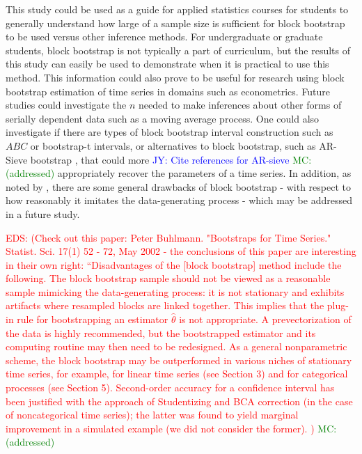 \documentclass[12pt, letterpaper, titlepage]{article}
\newcommand{\jy}[1]{\textcolor{blue}{JY: #1}}
\newcommand{\eds}[1]{\textcolor{red}{EDS: (#1)}}
\newcommand{\mc}[1]{\textcolor{green}{MC: (#1)}}
\begin{document}
This study could be used as a guide for applied statistics courses for students
to generally understand how large of a sample size is sufficient for block
bootstrap to be used versus other inference methods. For undergraduate or
graduate students, block bootstrap is not typically a part of curriculum, but
the results of this study can easily be used to demonstrate when it is
practical to use this method. This information could also prove to be useful
for research using block bootstrap estimation of time series in domains such
as econometrics. Future studies could investigate the $n$ needed to make
inferences about other forms
of serially dependent data such as a moving average process. One could also
investigate if there are types of block
bootstrap interval construction such as $ABC$ or bootstrap-t intervals, or
alternatives to block bootstrap, such as AR-Sieve bootstrap
 \citep{kreiss1992bootstrap}, that could more
\jy{Cite references for AR-sieve} \mc{addressed}
appropriately recover the parameters of a time series. In addition, as noted by
\citet{buhlmann2002bootstraps}, there are some 
general drawbacks of block bootstrap - with respect to how reasonably it imitates 
the data-generating process - which may be addressed in a future study.


\eds{Check out this paper:
Peter Buhlmann. "Bootstraps for Time Series." Statist. Sci. 17(1) 52 - 72, 
May 2002 - the conclusions of this paper are interesting in their own right:
``Disadvantages of the [block bootstrap] method include the following.
The block bootstrap sample should not be viewed as
a reasonable sample mimicking the data-generating
process: it is not stationary and exhibits artifacts where
resampled blocks are linked together. This implies that
the plug-in rule for bootstrapping an estimator $\hat{\theta}$ is not
appropriate. A prevectorization of the data is highly
recommended, but the bootstrapped estimator and its
computing routine may then need to be redesigned. As
a general nonparametric scheme, the block bootstrap
may be outperformed in various niches of stationary
time series, for example, for linear time series (see Section 3) 
and for categorical processes (see Section 5).
Second-order accuracy for a confidence interval has
been justified with the approach of Studentizing and
BCA correction (in the case of noncategorical time series); 
the latter was found to yield marginal improvement in a 
simulated example (we did not consider the former). } \mc{addressed}
	





\end{document}
